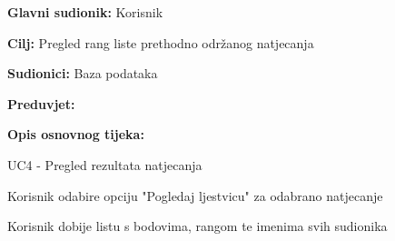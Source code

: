 					\noindent {}
					\begin{packed_item}
						
						\item \textbf{Glavni sudionik: }Korisnik
						\item  \textbf{Cilj:} Pregled rang liste prethodno održanog natjecanja
						\item  \textbf{Sudionici:} Baza podataka
						\item  \textbf{Preduvjet:}
						\item  \textbf{Opis osnovnog tijeka:}
						
						\item[] \begin{packed_enum}
							
							\item UC4 - Pregled rezultata natjecanja
							\item Korisnik odabire opciju "Pogledaj ljestvicu" za odabrano natjecanje
							\item Korisnik dobije listu s bodovima, rangom te imenima svih sudionika
						\end{packed_enum}					
					\end{packed_item}
					
